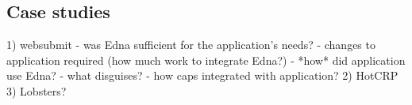 \subsection{Case studies}
   1) websubmit
      - was Edna sufficient for the application's needs?
      - changes to application required (how much work to integrate Edna?)
      - *how* did application use Edna?
        - what disguises?
        - how caps integrated with application?
   2) HotCRP
   3) Lobsters?



